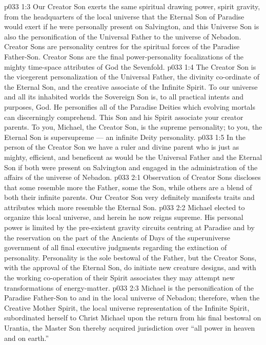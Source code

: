 \vs p033 1:3 Our Creator Son exerts the same spiritual drawing power, spirit gravity, from the headquarters of the local universe that the Eternal Son of Paradise would exert if he were personally present on Salvington, and  this Universe Son is also the personification of the Universal Father to the universe of Nebadon. Creator Sons are personality centres for the spiritual forces of the Paradise Father\hyp{}Son. Creator Sons are the final power\hyp{}personality focalizations of the mighty time\hyp{}space attributes of God the Sevenfold.
\vs p033 1:4 The Creator Son is the vicegerent personalization of the Universal Father, the divinity co\hyp{}ordinate of the Eternal Son, and the creative associate of the Infinite Spirit. To our universe and all its inhabited worlds the Sovereign Son is, to all practical intents and purposes, God. He personifies all of the Paradise Deities which evolving mortals can discerningly comprehend. This Son and his Spirit associate  your creator parents. To you, Michael, the Creator Son, is the supreme personality; to you, the Eternal Son is supersupreme --- an infinite Deity personality.
\vs p033 1:5 \pc In the person of the Creator Son we have a ruler and divine parent who is just as mighty, efficient, and beneficent as would be the Universal Father and the Eternal Son if both were present on Salvington and engaged in the administration of the affairs of the universe of Nebadon.
\vs p033 2:1 Observation of Creator Sons discloses that some resemble more the Father, some the Son, while others are a blend of both their infinite parents. Our Creator Son very definitely manifests traits and attributes which more resemble the Eternal Son.
\vs p033 2:2 Michael elected to organize this local universe, and herein he now reigns supreme. His personal power is limited by the pre\hyp{}existent gravity circuits centring at Paradise and by the reservation on the part of the Ancients of Days of the superuniverse government of all final executive judgments regarding the extinction of personality. Personality is the sole bestowal of the Father, but the Creator Sons, with the approval of the Eternal Son, do initiate new creature designs, and with the working co\hyp{}operation of their Spirit associates they may attempt new transformations of energy\hyp{}matter.
\vs p033 2:3 \pc Michael is the personification of the Paradise Father\hyp{}Son to and in the local universe of Nebadon; therefore, when the Creative Mother Spirit, the local universe representation of the Infinite Spirit, subordinated herself to Christ Michael upon the return from his final bestowal on Urantia, the Master Son thereby acquired jurisdiction over “all power in heaven and on earth.”
